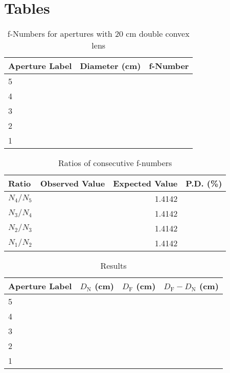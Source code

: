 \section{Tables}
%
\begin{table}[ht]
    \begin{center}
        \begin{tabular}{l|r|r}
            \textbf{Aperture Label} & \textbf{Diameter} (cm) & \textbf{f-Number} \\
            \hline
            5 & & \\
            4 & & \\
            3 & & \\
            2 & & \\
            1 & & \\
            \hline
        \end{tabular}
    \end{center}
    \caption{f-Numbers for apertures with 20 cm double convex lens}
    \label{table.09.fnumbers}
\end{table}
%
\begin{table}[ht]
    \begin{center}
        \begin{tabular}{l|r|r|r}
            \textbf{Ratio} & \textbf{Observed Value} & \textbf{Expected Value} & \textbf{P.D.} (\%) \\
            \hline
            $N_{4} / N_{5}$ & & 1.4142 & \\
            $N_{3} / N_{4}$ & & 1.4142 & \\
            $N_{2} / N_{3}$ & & 1.4142 & \\
            $N_{1} / N_{2}$ & & 1.4142 & \\
            \hline
        \end{tabular}
    \end{center}
    \caption{Ratios of consecutive f-numbers}
    \label{table.09.ratios}
\end{table}
%
\begin{table}[ht]
    \begin{center}
        \begin{tabular}{l|r|r|r}
            \textbf{Aperture Label} & $D_{\text{N}}$ (cm) & $D_{\text{F}}$ (cm) & $D_{\text{F}} - D_{\text{N}}$ (cm) \\
            \hline
            5 & & & \\
            4 & & & \\
            3 & & & \\
            2 & & & \\
            1 & & & \\
            \hline
        \end{tabular}
    \end{center}
    \caption{Results}
    \label{table.09.results}
\end{table}
%